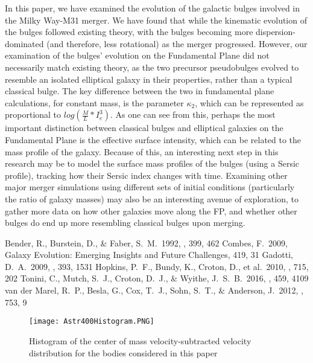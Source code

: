 \documentclass[iop]{emulateapj}
\begin{document}
In this paper, we have examined the evolution of the galactic bulges involved in the Milky Way-M31 merger. We have found that while the kinematic evolution of the bulges followed existing theory, with the bulges becoming more dispersion-dominated (and therefore, less rotational) as the merger progressed. However, our examination of the bulges' evolution on the Fundamental Plane did not necessarily match existing theory, as the two precursor pseudobulges evolved to resemble an isolated elliptical galaxy in their properties, rather than a typical classical bulge. The key difference between the two in fundamental plane calculations, for constant mass, is the parameter $\kappa_2$, which can be represented as proportional to $log(\frac{M}{L} * I_e^3)$. As one can see from this, perhaps the most important distinction between classical bulges and elliptical galaxies on the Fundamental Plane is the effective surface intensity, which can be related to the mass profile of the galaxy. Because of this, an interesting next step in this research may be to model the surface mass profiles of the bulges (using a Sersic profile), tracking how their Sersic index changes with time. Examining other major merger simulations using different sets of initial conditions (particularly the ratio of galaxy masses) may also be an interesting avenue of exploration, to gather more data on how other galaxies move along the FP, and whether other bulges do end up more resembling classical bulges upon merging.

\begin{thebibliography}{}
 Bender, R., Burstein, D., \& Faber, S.~M.\ 1992, \apj, 399, 462 
 Combes, F.\ 2009, Galaxy Evolution: Emerging Insights and Future Challenges, 419, 31 
 Gadotti, D.~A.\ 2009, \mnras, 393, 1531 
 Hopkins, P.~F., Bundy, K., Croton, D., et al.\ 2010, \apj, 715, 202 
 Tonini, C., Mutch, S.~J., Croton, D.~J., \& Wyithe, J.~S.~B.\ 2016, \mnras, 459, 4109 
 van der Marel, R.~P., Besla, G., Cox, T.~J., Sohn, S.~T., \& Anderson, J.\ 2012, \apj, 753, 9 

\end{thebibliography}

\begin{figure}
    \centering
    \texttt{[image: Astr400Histogram.PNG]}
    \caption{Histogram of the center of mass velocity-subtracted velocity distribution for the bodies considered in this paper}
\end{figure}
\end{document}

